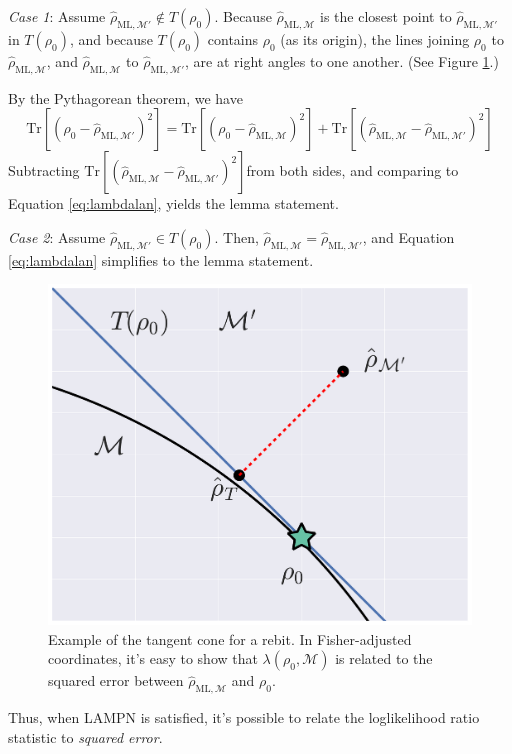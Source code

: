 \documentclass[aps,pra, twocolumn]{revtex4-1}
\newcommand{\M}{\mathcal{M}}
\newcommand{\rhohat}{\hat{\rho}}
\newcommand{\rhoML}[1]{\rhohat_{\scriptscriptstyle{\mathrm{ML},#1}}}
\begin{document}
\emph{Case 1}: Assume $\rhoML{\M'} \not \in T(\rho_{0})$. Because $\rhoML{\M}$ is the closest point to $\rhoML{\M'}$ in $T(\rho_{0})$, and because $T(\rho_{0})$ contains $\rho_{0}$ (as its origin), the lines joining $\rho_{0}$ to $\rhoML{\M}$, and $\rhoML{\M}$ to $\rhoML{\M'}$, are at right angles to one another. (See Figure \ref{fig:tangentcone}.) 

 By the Pythagorean theorem, we have
\[\mathrm{Tr}[(\rho_{0} -\rhoML{\M'})^{2}] =  \mathrm{Tr}[(\rho_{0} - \rhoML{\M})^{2}] + \mathrm{Tr}[(\rhoML{\M} - \rhoML{\M'})^{2}]\]
Subtracting $\mathrm{Tr}[(\rhoML{\M} - \rhoML{\M'})^{2}]$from both sides, and comparing to Equation \eqref{eq:lambdalan}, yields the lemma statement.

\emph{Case 2}: Assume $\rhoML{\M'} \in T(\rho_{0})$. Then, $\rhoML{\M}= \rhoML{\M'}$, and Equation \eqref{eq:lambdalan} simplifies to the lemma statement.
\begin{figure}[h]
\includegraphics[width=\columnwidth]{Images/Figure_temp.pdf}
 \caption{Example of the tangent cone for a rebit. In Fisher-adjusted coordinates, it's easy to show that $\lambda(\rho_{0}, \M)$ is related to the squared error between $\rhoML{\M}$ and $\rho_{0}$.}
\label{fig:tangentcone}
\end{figure}
\todo[inline]{Change $\rho_{T} -> \rhoML{\M}$}
Thus, when LAMPN is satisfied, it's possible to relate the loglikelihood ratio statistic to \emph{squared error}. 
\end{document}
